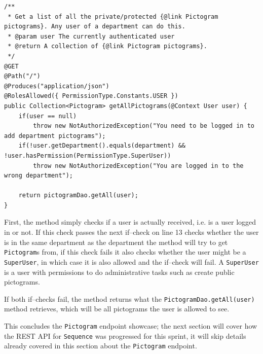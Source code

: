\begin{lstlisting}[float, floatplacement=h, caption={A GET request to get all pictograms for a department.},label={lst:getallPictograms}]
/**
 * Get a list of all the private/protected {@link Pictogram pictograms}. Any user of a department can do this.
 * @param user The currently authenticated user
 * @return A collection of {@link Pictogram pictograms}.
 */
@GET
@Path("/")
@Produces("application/json")
@RolesAllowed({ PermissionType.Constants.USER })
public Collection<Pictogram> getAllPictograms(@Context User user) {
    if(user == null)
        throw new NotAuthorizedException("You need to be logged in to add department pictograms");
    if(!user.getDepartment().equals(department) && !user.hasPermission(PermissionType.SuperUser))
        throw new NotAuthorizedException("You are logged in to the wrong department");

    return pictogramDao.getAll(user);
}
\end{lstlisting}

First, the method simply checks if a user is actually received, i.e. is a user logged in or not.
If this check passes the next if--check on line 13 checks whether the user is in the same department as the department the method will try to get \texttt{Pictogram}s from, if this check fails it also checks whether the user might be a \texttt{SuperUser}, in which case it is also allowed and the if--check will fail.
A \texttt{SuperUser} is a user with permissions to do administrative tasks such as create public pictograms.

If both if--checks fail, the method returns what the \texttt{PictogramDao.getAll(user)} method retrieves, which will be all pictograms the user is allowed to see.

This concludes the \texttt{Pictogram} endpoint showcase; the next section will cover how the REST API for \texttt{Sequence} was progressed for this sprint, it will skip details already covered in this section about the \texttt{Pictogram} endpoint.
